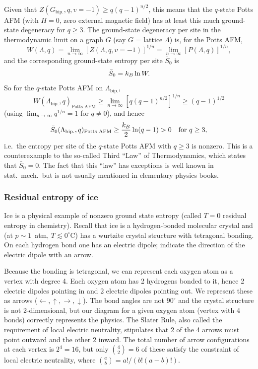 Given that $Z(G_{\text{bip.}},q,v=-1)\ge q(q-1)^{n/2}$, this means that the $q$-state Potts AFM
(with $H = 0$, zero external magnetic field) has at least this much ground-state degeneracy for
$q\ge 3$. The ground-state degeneracy per site in the thermodynamic limit on a graph $G$ (say
$G$ = lattice $\Lambda$) is, for the Potts AFM,
\begin{equation}
  W(\Lambda,q) = \lim_{n\to\infty}\left[Z(\Lambda,q,v=-1)\right]^{1/n}
              = \lim_{n\to\infty}\left[P(\Lambda,q)\right]^{1/n},
\end{equation}
and the corresponding ground-state entropy per site $\bar S_0$ is
\begin{equation}
  \bar S_0 = k_{B}\ln W .
\end{equation}
So for the $q$-state Potts AFM on $\Lambda_{\text{bip.}}$,
\begin{equation}
  W(\Lambda_{\text{bip.}},q)_{\text{Potts AFM}}\ge\lim_{n\to\infty}\left[q(q-1)^{n/2}\right]^{1/n}\ge(q-1)^{1/2}
\end{equation}
(using $\lim_{n\to\infty}q^{1/n} = 1$ for $q\ne 0$), and hence
\begin{equation}
  \bar S_0(\Lambda_{\text{bip.}},q)_{\text{Potts AFM}}\ge\frac{k_{B}}{2}\ln(q-1)>0\quad\text{for } q\ge 3,
\end{equation}
i.e.\ the entropy per site of the $q$-state Potts AFM with $q\ge 3$ is nonzero. This is a
counterexample to the so-called Third ``Law'' of Thermodynamics, which states that
$\bar S_0 = 0$. The fact that this ``law'' has exceptions is well known in stat.\ mech.\ but is
not usually mentioned in elementary physics books.

\subsubsection*{Residual entropy of ice}

Ice is a physical example of nonzero ground state entropy (called $T = 0$ residual entropy in
chemistry). Recall that ice is a hydrogen-bonded molecular crystal and (at $p\sim 1$~atm,
$T\lesssim 0^\circ$C) has a wurtzite crystal structure with tetragonal bonding. On each hydrogen
bond one has an electric dipole; indicate the direction of the electric dipole with an arrow.

Because the bonding is tetragonal, we can represent each oxygen atom as a vertex with degree 4.
Each oxygen atom has 2 hydrogens bonded to it, hence 2 electric dipoles pointing in and 2
electric dipoles pointing out. We represent these as arrows
($\leftarrow,\uparrow,\rightarrow,\downarrow$). The bond angles are not $90^\circ$ and the
crystal structure is not 2-dimensional, but our diagram for a given oxygen atom (vertex with 4
bonds) correctly represents the physics. The Slater Rule, also called the requirement of local
electric neutrality, stipulates that 2 of the 4 arrows must point outward and the other 2
inward. The total number of arrow configurations at each vertex is $2^4 = 16$, but only
$\binom42 = 6$ of these satisfy the constraint of local electric neutrality, where
$\binom ab = a!/(b!(a-b)!)$.

